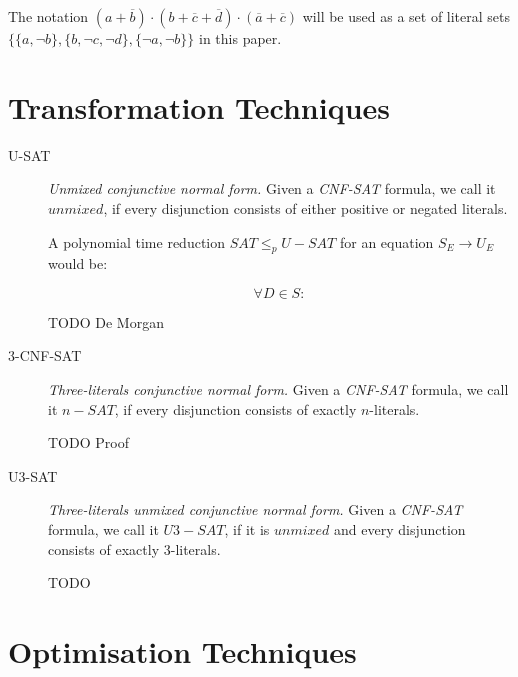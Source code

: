 \documentclass[12pt, letterpaper]{article}
\begin{document}
\begin{description}
{            The notation $(a+\overline b) \cdot (b +\overline c +
            \overline d) \cdot (\overline a +\overline c)$ will be used as 
            a set of literal sets $\{\{a, \lnot b\}, \{b, \lnot c,
            \lnot d\}, \{\lnot a, \lnot b\}\}$ in this paper.
        }
    \end{description}

    \section{Transformation Techniques}

    \begin{description}
        \item[U-SAT] {
            \emph{Unmixed conjunctive normal form.} Given a
            \emph{CNF-SAT} formula, we call it $unmixed$, if
            every disjunction consists of either positive or 
            negated literals.

            A polynomial time reduction $SAT \leq_p U-SAT$
            for an equation $S_E \rightarrow U_E$ would be:

            \[\forall D \in S:\]

            TODO De Morgan
        }
        \item[3-CNF-SAT] {
            \emph{Three-literals conjunctive normal form.} Given a
            \emph{CNF-SAT} formula, we call it $n-SAT$, if
            every disjunction consists of exactly $n$-literals.
            
            TODO Proof
        }
        \item[U3-SAT] {
            \emph{Three-literals unmixed conjunctive normal form.}
            Given a \emph{CNF-SAT} formula, we call it $U3-SAT$, if
            it is $unmixed$ and every disjunction consists of
            exactly $3$-literals.
            
            TODO 
        }
    \end{description}

    \section{Optimisation Techniques}
\end{document}
